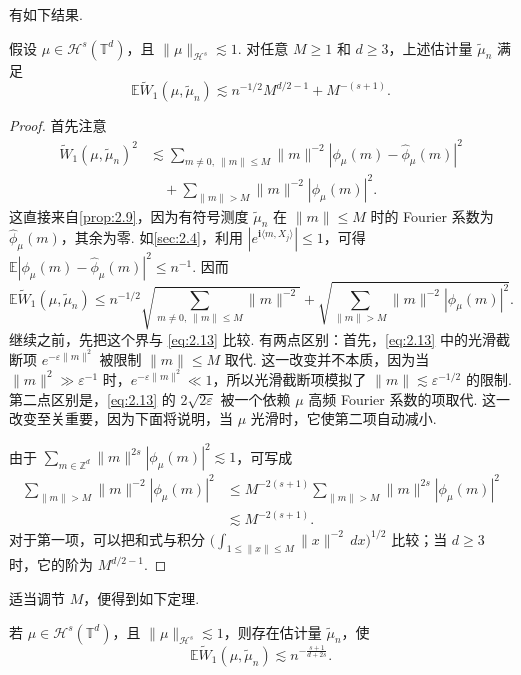 有如下结果.
\begin{proposition}\label{prop:2.17}
假设 $\mu\in\mathcal H^s(\mathbb T^d)$，且 $\lVert\mu\rVert_{\mathcal H^s}\lesssim1$. 对任意 $M\ge1$ 和 $d\ge3$，上述估计量 $\tilde\mu_n$ 满足
$$\mathbb E\widetilde W_1(\mu,\tilde\mu_n)\lesssim n^{-1/2}M^{d/2-1}+M^{-(s+1)}.$$
\end{proposition}
\begin{proof}
首先注意
$$\begin{aligned}
\widetilde W_1(\mu,\tilde\mu_n)^2
&\lesssim\sum_{m\ne0,\ \lVert m\rVert\le M}\lVert m\rVert^{-2}|\phi_\mu(m)-\widehat\phi_\mu(m)|^2\\
&\quad+\sum_{\lVert m\rVert>M}\lVert m\rVert^{-2}|\phi_\mu(m)|^2.
\end{aligned}$$
这直接来自\autoref{prop:2.9}，因为有符号测度 $\tilde\mu_n$ 在 $\lVert m\rVert\le M$ 时的 Fourier 系数为 $\widehat\phi_\mu(m)$，其余为零. 如\autoref{sec:2.4}，利用 $|e^{\mathbf i\langle m,X_j\rangle}|\le1$，可得 $\mathbb E|\phi_\mu(m)-\widehat\phi_\mu(m)|^2\le n^{-1}$. 因而
$$\mathbb E\widetilde W_1(\mu,\tilde\mu_n)
\le n^{-1/2}\sqrt{\sum_{m\ne0,\ \lVert m\rVert\le M}\lVert m\rVert^{-2}}
+\sqrt{\sum_{\lVert m\rVert>M}\lVert m\rVert^{-2}|\phi_\mu(m)|^2}.$$
继续之前，先把这个界与 \eqref{eq:2.13} 比较. 有两点区别：首先，\eqref{eq:2.13} 中的光滑截断项 $e^{-\varepsilon\lVert m\rVert^2}$ 被限制 $\lVert m\rVert\le M$ 取代. 这一改变并不本质，因为当 $\lVert m\rVert^2\gg\varepsilon^{-1}$ 时，$e^{-\varepsilon\lVert m\rVert^2}\ll1$，所以光滑截断项模拟了 $\lVert m\rVert\lesssim\varepsilon^{-1/2}$ 的限制. 第二点区别是，\eqref{eq:2.13} 的 $2\sqrt{2\varepsilon}$ 被一个依赖 $\mu$ 高频 Fourier 系数的项取代. 这一改变至关重要，因为下面将说明，当 $\mu$ 光滑时，它使第二项自动减小.

由于 $\sum_{m\in\mathbb Z^d}\lVert m\rVert^{2s}|\phi_\mu(m)|^2\lesssim1$，可写成
$$\begin{aligned}
\sum_{\lVert m\rVert>M}\lVert m\rVert^{-2}|\phi_\mu(m)|^2
&\le M^{-2(s+1)}\sum_{\lVert m\rVert>M}\lVert m\rVert^{2s}|\phi_\mu(m)|^2\\
&\lesssim M^{-2(s+1)}.
\end{aligned}$$
对于第一项，可以把和式与积分 $\bigl(\int_{1\le\lVert x\rVert\le M}\lVert x\rVert^{-2}\,dx\bigr)^{1/2}$ 比较；当 $d\ge3$ 时，它的阶为 $M^{d/2-1}$.
\end{proof}
适当调节 $M$，便得到如下定理.
\begin{theorem}\label{thm:2.18}
若 $\mu\in\mathcal H^s(\mathbb T^d)$，且 $\lVert\mu\rVert_{\mathcal H^s}\lesssim1$，则存在估计量 $\tilde\mu_n$，使
$$\mathbb E\widetilde W_1(\mu,\tilde\mu_n)\lesssim n^{-\frac{s+1}{d+2s}}.$$
\end{theorem}
